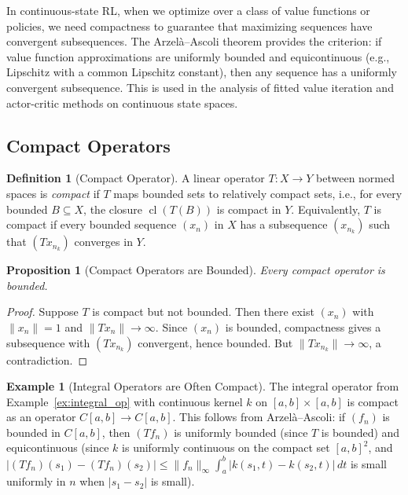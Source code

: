 \documentclass[11pt,a4paper]{article}
\theoremstyle{definition}
\newtheorem{definition}{Definition}[section]
\newtheorem{example}{Example}[section]
\theoremstyle{plain}
\newtheorem{proposition}[theorem]{Proposition}
\theoremstyle{remark}
\DeclareMathOperator{\cl}{cl}
\begin{document}
\begin{rlconnection}
In continuous-state RL, when we optimize over a class of value functions or
policies, we need compactness to guarantee that maximizing sequences have
convergent subsequences. The Arzel\`{a}--Ascoli theorem provides the criterion:
if value function approximations are uniformly bounded and equicontinuous (e.g.,
Lipschitz with a common Lipschitz constant), then any sequence has a uniformly
convergent subsequence. This is used in the analysis of fitted value iteration
and actor-critic methods on continuous state spaces.
\end{rlconnection}

\subsection{Compact Operators}

\begin{definition}[Compact Operator]
\label{def:compact_op}
A linear operator $T \colon X \to Y$ between normed spaces is \emph{compact} if
$T$ maps bounded sets to relatively compact sets, i.e., for every bounded
$B \subseteq X$, the closure $\cl(T(B))$ is compact in $Y$.
Equivalently, $T$ is compact if every bounded sequence $(x_n)$ in $X$ has a
subsequence $(x_{n_k})$ such that $(Tx_{n_k})$ converges in $Y$.
\end{definition}

\begin{proposition}[Compact Operators are Bounded]
\label{prop:compact_bounded}
Every compact operator is bounded.
\end{proposition}

\begin{proof}
Suppose $T$ is compact but not bounded. Then there exist $(x_n)$ with $\|x_n\| = 1$
and $\|Tx_n\| \to \infty$. Since $(x_n)$ is bounded, compactness gives a
subsequence with $(Tx_{n_k})$ convergent, hence bounded. But $\|Tx_{n_k}\| \to
\infty$, a contradiction.
\end{proof}

\begin{example}[Integral Operators are Often Compact]
\label{ex:compact_integral}
The integral operator from Example~\ref{ex:integral_op} with continuous kernel
$k$ on $[a,b] \times [a,b]$ is compact as an operator $C[a,b] \to C[a,b]$. This
follows from Arzel\`{a}--Ascoli: if $(f_n)$ is bounded in $C[a,b]$, then
$(Tf_n)$ is uniformly bounded (since $T$ is bounded) and equicontinuous (since $k$
is uniformly continuous on the compact set $[a,b]^2$, and
$|(Tf_n)(s_1) - (Tf_n)(s_2)| \le \|f_n\|_\infty \int_a^b |k(s_1,t) - k(s_2,t)|\, dt$
is small uniformly in $n$ when $|s_1 - s_2|$ is small).
\end{example}
\end{document}
